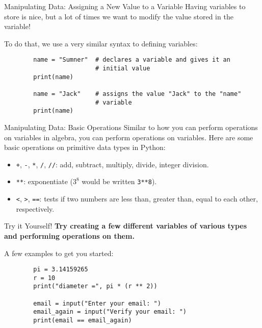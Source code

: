 \documentclass{acm}
\begin{document}
\begin{frame}[fragile]{Manipulating Data: Assigning a New Value to a Variable}
    Having variables to store is nice, but a lot of times we want to modify the
    value stored in the variable!

    To do that, we use a very similar syntax to defining variables:
    \begin{verbatim}
        name = "Sumner"  # declares a variable and gives it an
                         # initial value
        print(name)

        name = "Jack"    # assigns the value "Jack" to the "name"
                         # variable
        print(name)
    \end{verbatim}
\end{frame}

\begin{frame}{Manipulating Data: Basic Operations}
    Similar to how you can perform operations on variables in algebra, you can
    perform operations on variables. Here are some basic operations on primitive
    data types in Python:

    \begin{itemize}
        \item \texttt{+}, \texttt{-}, \texttt{*}, \texttt{/}, \texttt{//}: add,
            subtract, multiply, divide, integer division.
        \item \texttt{**}: exponentiate ($3^8$ would be written \texttt{3**8}).
        \item \texttt{<}, \texttt{>}, \texttt{==}: tests if two numbers are less
            than, greater than, equal to each other, respectively.
    \end{itemize}
\end{frame}

\begin{frame}[fragile]{Try it Yourself!}
    \textbf{Try creating a few different variables of various types and
    performing operations on them.}

    A few examples to get you started:
    \begin{verbatim}
        pi = 3.14159265
        r = 10
        print("diameter =", pi * (r ** 2))

        email = input("Enter your email: ")
        email_again = input("Verify your email: ")
        print(email == email_again)
    \end{verbatim}
\end{frame}
\end{document}

